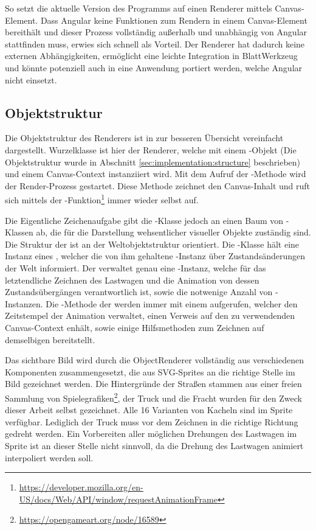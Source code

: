 So setzt die aktuelle Version des Programms auf einen Renderer mittels Canvas-Element. Dass Angular keine Funktionen zum Rendern in einem Canvas-Element bereithält und dieser Prozess vollständig außerhalb und unabhängig von Angular stattfinden muss, erwies sich schnell als Vorteil. Der Renderer hat dadurch keine externen Abhängigkeiten, ermöglicht eine leichte Integration in BlattWerkzeug und könnte potenziell auch in eine Anwendung portiert werden, welche Angular nicht einsetzt.

\subsection{Objektstruktur}

Die Objektstruktur des Renderers ist in  zur besseren Übersicht vereinfacht dargestellt. Wurzelklasse ist hier der Renderer, welche mit einem -Objekt (Die Objektstruktur wurde in Abschnitt \ref{sec:implementation:structure} beschrieben) und einem Canvas-Context instanziiert wird. Mit dem Aufruf der -Methode wird der Render-Prozess gestartet. Diese Methode zeichnet den Canvas-Inhalt und ruft sich mittels der -Funktion\footnote{\url{https://developer.mozilla.org/en-US/docs/Web/API/window/requestAnimationFrame}} immer wieder selbst auf.

Die Eigentliche Zeichenaufgabe gibt die -Klasse jedoch an einen Baum von -Klassen ab, die für die Darstellung wehsentlicher visueller Objekte zuständig sind. Die Struktur der  ist an der Weltobjektstruktur  orientiert. Die -Klasse hält eine Instanz eines , welcher die von ihm gehaltene -Instanz über Zustandsänderungen der Welt informiert. Der  verwaltet genau eine -Instanz, welche für das letztendliche Zeichnen des Lastwagen und die Animation von dessen Zustandsübergängen verantwortlich ist, sowie die notwenige Anzahl von -Instanzen. Die -Methode der  werden immer mit einem  aufgerufen, welcher den Zeitstempel der Animation verwaltet, einen Verweis auf den zu verwendenden Canvas-Context enhält, sowie einige Hilfsmethoden zum Zeichnen auf demselbigen bereitstellt.

Das sichtbare Bild wird durch die ObjectRenderer vollständig aus verschiedenen Komponenten zusammengesetzt, die aus SVG-Sprites an die richtige Stelle im Bild gezeichnet werden. Die Hintergründe der Straßen stammen aus einer freien Sammlung von Spielegrafiken\footnote{\url{https://opengameart.org/node/16589}}, der Truck und die Fracht wurden für den Zweck dieser Arbeit selbst gezeichnet. Alle 16 Varianten von Kacheln sind im Sprite verfügbar. Lediglich der Truck muss vor dem Zeichnen in die richtige Richtung gedreht werden. Ein Vorbereiten aller möglichen Drehungen des Lastwagen im Sprite ist an dieser Stelle nicht sinnvoll, da die Drehung des Lastwagen animiert interpoliert werden soll.

